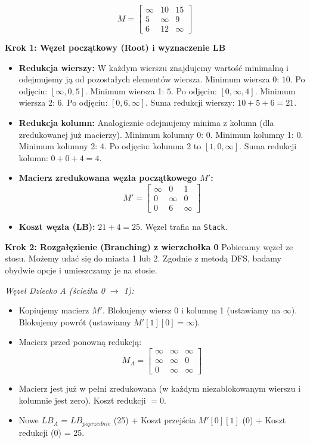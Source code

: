 \documentclass[12pt, a4paper]{article}
\begin{document}
$$ M = \begin{bmatrix} \infty & 10 & 15 \\ 5 & \infty & 9 \\ 6 & 12 & \infty \end{bmatrix} $$

\textbf{Krok 1: Węzeł początkowy (Root) i wyznaczenie LB}
\begin{itemize}
	\item \textbf{Redukcja wierszy:} W każdym wierszu znajdujemy wartość minimalną i odejmujemy ją od pozostałych elementów wiersza. 
	Minimum wiersza 0: $10$. Po odjęciu: $[\infty, 0, 5]$.
	Minimum wiersza 1: $5$. Po odjęciu: $[0, \infty, 4]$.
	Minimum wiersza 2: $6$. Po odjęciu: $[0, 6, \infty]$.
	Suma redukcji wierszy: $10 + 5 + 6 = 21$.
	\item \textbf{Redukcja kolumn:} Analogicznie odejmujemy minima z kolumn (dla zredukowanej już macierzy).
	Minimum kolumny 0: $0$.
	Minimum kolumny 1: $0$.
	Minimum kolumny 2: $4$. Po odjęciu: kolumna 2 to $[1, 0, \infty]$.
	Suma redukcji kolumn: $0 + 0 + 4 = 4$.
	\item \textbf{Macierz zredukowana węzła początkowego $M'$:}
	$$ M' = \begin{bmatrix} \infty & 0 & 1 \\ 0 & \infty & 0 \\ 0 & 6 & \infty \end{bmatrix} $$
	\item \textbf{Koszt węzła (LB):} $21 + 4 = 25$. Węzeł trafia na \texttt{Stack}.
\end{itemize}

\textbf{Krok 2: Rozgałęzienie (Branching) z wierzchołka 0}
Pobieramy węzeł ze stosu. Możemy udać się do miasta 1 lub 2. Zgodnie z metodą DFS, badamy obydwie opcje i umieszczamy je na stosie.

\textit{Węzeł Dziecko A (ścieżka 0 $\rightarrow$ 1):}
\begin{itemize}
	\item Kopiujemy macierz $M'$. Blokujemy wiersz 0 i kolumnę 1 (ustawiamy na $\infty$). Blokujemy powrót (ustawiamy $M'[1][0] = \infty$).
	\item Macierz przed ponowną redukcją:
	$$ M_A = \begin{bmatrix} \infty & \infty & \infty \\ \infty & \infty & 0 \\ 0 & \infty & \infty \end{bmatrix} $$
	\item Macierz jest już w pełni zredukowana (w każdym niezablokowanym wierszu i kolumnie jest zero). Koszt redukcji $= 0$.
	\item Nowe $LB_A$ = $LB_{poprzednie}$ (25) + Koszt przejścia $M'[0][1]$ (0) + Koszt redukcji (0) = 25.
\end{itemize}
\end{document}
